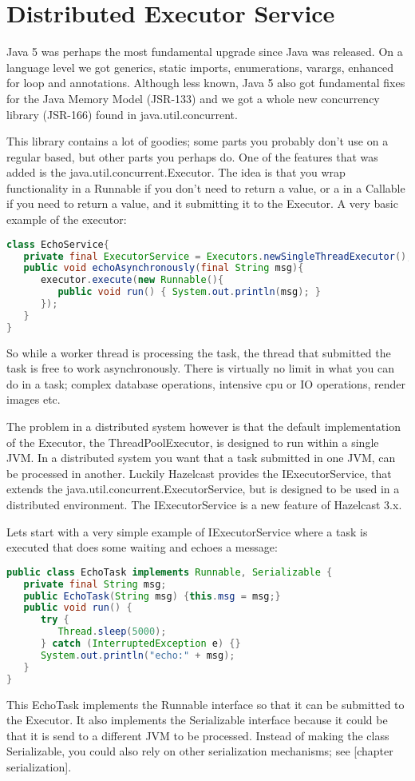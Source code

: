 \chapter{Distributed Executor Service}
Java 5 was perhaps the most fundamental upgrade since Java was released. On a language level we got generics, static imports, enumerations, varargs, enhanced for loop and annotations. Although less known, Java 5 also got fundamental fixes for the Java Memory Model (JSR-133) and we got a whole new concurrency library (JSR-166) found in java.util.concurrent.

This library contains a lot of goodies; some parts you probably don't use on a regular based, but other parts you perhaps do. One of the features that was added is the java.util.concurrent.Executor. The idea is that you wrap functionality in a Runnable if you don't need to return a value, or a in a Callable if you need to return a value, and it submitting it to the Executor. A very basic example of the executor:
\begin{lstlisting}[language=java]
class EchoService{
   private final ExecutorService = Executors.newSingleThreadExecutor();
   public void echoAsynchronously(final String msg){
      executor.execute(new Runnable(){
         public void run() { System.out.println(msg); }
      });	
   }
}
\end{lstlisting}
So while a worker thread is processing the task, the thread that submitted the task is free to work asynchronously. There is virtually no limit in what you can do in a task; complex database operations, intensive cpu or IO operations, render images etc. 

The problem in a distributed system however is that the default implementation of the Executor, the ThreadPoolExecutor, is designed to run within a single JVM. In a distributed system you want that a task submitted in one JVM, can be processed in another. Luckily Hazelcast provides the IExecutorService, that extends the java.util.concurrent.ExecutorService, but is designed to be used in a distributed environment. The IExecutorService is a new feature of Hazelcast 3.x.

Lets start with a very simple example of IExecutorService where a task is executed that does some waiting and echoes a message:
\begin{lstlisting}[language=java]
public class EchoTask implements Runnable, Serializable {
   private final String msg;
   public EchoTask(String msg) {this.msg = msg;}
   public void run() {
      try { 
         Thread.sleep(5000);
      } catch (InterruptedException e) {}
      System.out.println("echo:" + msg);
   }
}
\end{lstlisting}
This EchoTask implements the Runnable interface so that it can be submitted to the Executor. It also implements the Serializable interface because it could be that it is send to a different JVM to be processed. Instead of making the class Serializable, you could also rely on other serialization mechanisms; see [chapter serialization]. 

